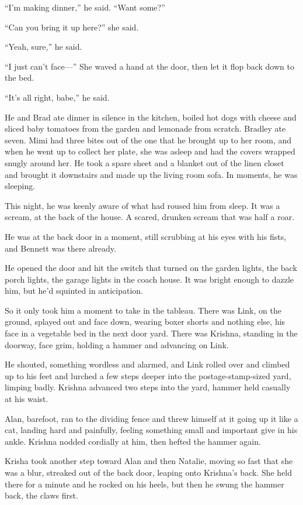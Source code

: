 ``I'm making dinner,'' he said.  ``Want some?''

``Can you bring it up here?'' she said.

``Yeah, sure,'' he said. 

``I just can't face---'' She waved a hand at the door, then let it
flop back down to the bed.

``It's all right, babe,'' he said.

He and Brad ate dinner in silence in the kitchen, boiled hot dogs with
cheese and sliced baby tomatoes from the garden and lemonade from
scratch.  Bradley ate seven.  Mimi had three bites out of the one that
he brought up to her room, and when he went up to collect her plate,
she was asleep and had the covers wrapped snugly around her.  He took
a spare sheet and a blanket out of the linen closet and brought it
downstairs and made up the living room sofa.  In moments, he was
sleeping.

This night, he was keenly aware of what had roused him from sleep.  It
was a scream, at the back of the house.  A scared, drunken scream that
was half a roar.

He was at the back door in a moment, still scrubbing at his eyes with
his fists, and Bennett was there already. 

He opened the door and hit the switch that turned on the garden
lights, the back porch lights, the garage lights in the coach house. 
It was bright enough to dazzle him, but he'd squinted in anticipation.

So it only took him a moment to take in the tableau.  There was Link,
on the ground, splayed out and face down, wearing boxer shorts and
nothing else, his face in a vegetable bed in the next door yard. 
There was Krishna, standing in the doorway, face grim, holding a
hammer and advancing on Link.

He shouted, something wordless and alarmed, and Link rolled over and
climbed up to his feet and lurched a few steps deeper into the
postage-stamp-sized yard, limping badly.  Krishna advanced two steps
into the yard, hammer held casually at his waist.

Alan, barefoot, ran to the dividing fence and threw himself at it
going up it like a cat, landing hard and painfully, feeling something
small and important give in his ankle.  Krishna nodded cordially at
him, then hefted the hammer again.

Krisha took another step toward Alan and then Natalie, moving so fast
that she was a blur, streaked out of the back door, leaping onto
Krishna's back.  She held there for a minute and he rocked on his
heels, but then he swung the hammer back, the claws first. 

